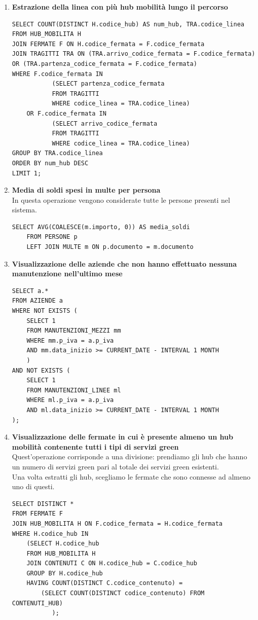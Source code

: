 \documentclass[12pt,a4paper]{report}
\begin{document}
\begin{enumerate}[label=\textbf{\arabic*)}]
\item \textbf{Estrazione della linea con più hub mobilità lungo il percorso} \\
\begin{lstlisting}[style=sqlstyle]
SELECT COUNT(DISTINCT H.codice_hub) AS num_hub, TRA.codice_linea
FROM HUB_MOBILITA H
JOIN FERMATE F ON H.codice_fermata = F.codice_fermata
JOIN TRAGITTI TRA ON (TRA.arrivo_codice_fermata = F.codice_fermata) OR (TRA.partenza_codice_fermata = F.codice_fermata)
WHERE F.codice_fermata IN
           (SELECT partenza_codice_fermata
           FROM TRAGITTI
           WHERE codice_linea = TRA.codice_linea)
    OR F.codice_fermata IN
           (SELECT arrivo_codice_fermata
           FROM TRAGITTI
           WHERE codice_linea = TRA.codice_linea)
GROUP BY TRA.codice_linea
ORDER BY num_hub DESC
LIMIT 1;
\end{lstlisting}

\item \textbf{Media di soldi spesi in multe per persona} \\
In questa operazione vengono considerate tutte le persone presenti nel sistema.
\begin{lstlisting}[style=sqlstyle, caption=Query for Average Fine Amount Grouped by Documento]
SELECT AVG(COALESCE(m.importo, 0)) AS media_soldi
    FROM PERSONE p
    LEFT JOIN MULTE m ON p.documento = m.documento
\end{lstlisting}

\item \textbf{Visualizzazione delle aziende che non hanno effettuato nessuna manutenzione nell’ultimo mese} \\
\begin{lstlisting}[style=sqlstyle, caption=Query for Companies Without Maintenance in Last Month]
SELECT a.*
FROM AZIENDE a
WHERE NOT EXISTS (
    SELECT 1
    FROM MANUTENZIONI_MEZZI mm
    WHERE mm.p_iva = a.p_iva
    AND mm.data_inizio >= CURRENT_DATE - INTERVAL 1 MONTH
    )
AND NOT EXISTS (
    SELECT 1
    FROM MANUTENZIONI_LINEE ml
    WHERE ml.p_iva = a.p_iva
    AND ml.data_inizio >= CURRENT_DATE - INTERVAL 1 MONTH
);
\end{lstlisting}

\item \textbf{Visualizzazione delle fermate in cui è presente almeno un hub mobilità contenente tutti i tipi di servizi green} \\
Quest'operazione corrisponde a una divisione: prendiamo gli hub che hanno un numero di servizi green pari al totale dei servizi green esistenti. \\
Una volta estratti gli hub, scegliamo le fermate che sono connesse ad almeno uno di questi.
\begin{lstlisting}[style=sqlstyle]
SELECT DISTINCT *
FROM FERMATE F
JOIN HUB_MOBILITA H ON F.codice_fermata = H.codice_fermata
WHERE H.codice_hub IN
	(SELECT H.codice_hub
	FROM HUB_MOBILITA H
	JOIN CONTENUTI C ON H.codice_hub = C.codice_hub
	GROUP BY H.codice_hub
	HAVING COUNT(DISTINCT C.codice_contenuto) =
		(SELECT COUNT(DISTINCT codice_contenuto) FROM CONTENUTI_HUB)
           );
\end{lstlisting}


\end{enumerate}
\end{document}
